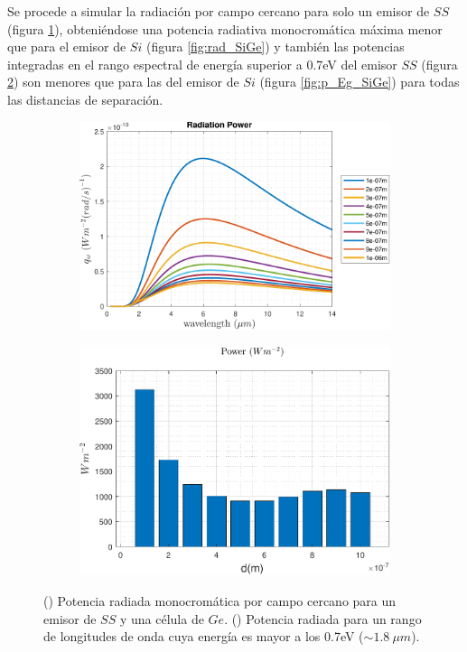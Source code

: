 Se procede a simular la radiación por campo cercano para solo un emisor de $SS$ (figura \ref{fig:SsGe}), obteniéndose una potencia radiativa monocromática máxima menor que para el emisor de $Si$ (figura \ref{fig:rad_SiGe}) y también las potencias integradas en el rango espectral de energía superior a 0.7eV del emisor $SS$ (figura \ref{fig:p_Eg_SsGe}) son menores que para las del emisor de $Si$ (figura \ref{fig:p_Eg_SiGe}) para todas las distancias de separación.
\begin{figure}[H]
	\centering
	\begin{subfigure}[b]{0.49\textwidth}
	\centering
		\includegraphics[width=1.00\textwidth]{figuras/Resultados/radiacion/SsGe.pdf}
	\caption{ }
	\label{fig:SsGe}
\end{subfigure}
\begin{subfigure}[b]{0.49\textwidth}
	\centering
		\includegraphics[width=1.00\textwidth]{figuras/Resultados/radiacion/p_Eg_SsGe.pdf}
	\caption{ }
	\label{fig:p_Eg_SsGe}
\end{subfigure}
\caption{() Potencia radiada monocromática por campo cercano para un emisor de $SS$ y una célula de $Ge$. () Potencia radiada para un rango de longitudes de onda cuya energía es mayor a los 0.7eV ($\sim 1.8 \ \mu m$).}
	\label{fig:rad_SsGe}
\end{figure}
